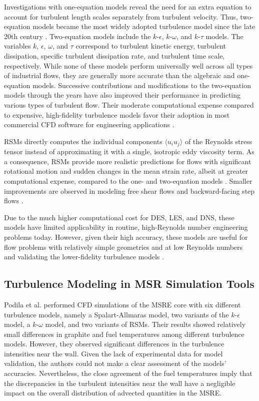 Investigations with
one-equation models reveal the need for an extra equation to account for
turbulent length scales separately from turbulent velocity. Thus, two-equation
models became the most widely adopted turbulence model since the late 20th century
\cite{pope_turbulent_2000}. Two-equation models include the $k$-$\epsilon$,
$k$-$\omega$, and $k$-$\tau$ models. The variables $k$, $\epsilon$, $\omega$,
and $\tau$ correspond to turbulent kinetic energy, turbulent dissipation,
specific turbulent dissipation rate, and turbulent time scale, respectively.
While none of these models perform universally well across all types of
industrial flows, they are generally more
accurate than the algebraic and one-equation models. Successive contributions
and modifications to the two-equation models through the years have also
improved their performance in predicting various types of turbulent flow. Their
moderate computational expense compared to expensive, high-fidelity turbulence
models favor their adoption in most commercial \gls{CFD} software for
engineering applications \cite{pope_turbulent_2000}.

\glspl{RSM} directly computes the individual components $\langle u_i u_j
\rangle$ of the Reynolds stress tensor instead of approximating it with a
single, isotropic eddy viscosity term. As a consequence, \glspl{RSM} provide
more realistic predictions for flows with significant rotational motion and
sudden changes in the mean strain rate, albeit at greater computational
expense, compared to the one- and two-equation models
\cite{wilcox_turbulence_2006}. Smaller improvements are observed in modeling
free shear flows and backward-facing step flows \cite{wilcox_turbulence_2006}.

Due to the much higher computational cost for \gls{DES}, \gls{LES}, and
\gls{DNS}, these models have limited applicability in routine, high-Reynolds
number engineering problems today. However, given their high accuracy, these
models are useful for flow problems with relatively simple geometries and at
low Reynolds numbers and validating the lower-fidelity turbulence models
\cite{zhiyin_large-eddy_2015}.

\subsection{Turbulence Modeling in MSR Simulation Tools}

Podila et al. \cite{podila_cfd_2019} performed \gls{CFD} simulations of the
\gls{MSRE} core with six different turbulence models, namely a Spalart-Allmaras
model, two variants of the $k$-$\epsilon$ model, a $k$-$\omega$ model, and two
variants of \glspl{RSM}. Their results showed relatively small differences
in graphite and fuel temperatures among different turbulence models. However,
they observed significant differences in the turbulence intensities near the
wall. Given the lack of experimental data for model validation, the authors
could not make a clear assessment of the models' accuracies. Nevertheless, the
close agreement of the fuel temperatures imply that the discrepancies in the
turbulent intensities near the wall have a negligible impact on the overall
distribution of advected quantities in the \gls{MSRE}.

